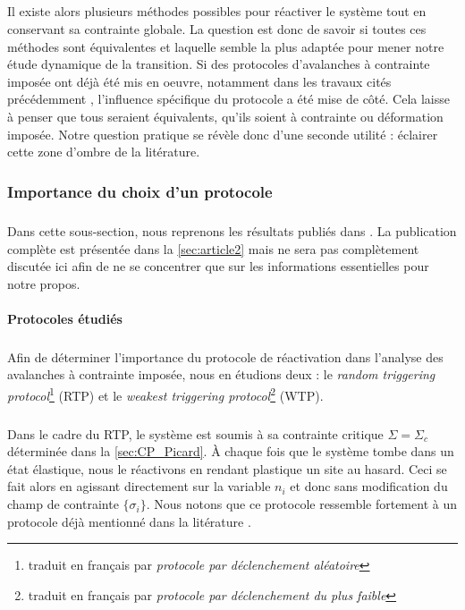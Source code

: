\subparagraph{}Il existe alors plusieurs méthodes possibles pour réactiver le système tout en conservant sa contrainte globale. La question est donc de savoir si toutes ces méthodes sont équivalentes et laquelle semble la plus adaptée pour mener notre étude dynamique de la transition. Si des protocoles d'avalanches à contrainte imposée ont déjà été mis en oeuvre, notamment dans les travaux cités précédemment \cite{budrikis_universal_2017, lin_scaling_2014}, l'influence spécifique du protocole a été mise de côté. Cela laisse à penser que tous seraient équivalents, qu'ils soient à contrainte ou déformation imposée. Notre question pratique se révèle donc d'une seconde utilité : éclairer cette zone d'ombre de la litérature.

\subsubsection{Importance du choix d'un protocole}

\label{sec:imp_prot}

\subparagraph{}Dans cette sous-section, nous reprenons les résultats publiés dans \cite{jocteur_protocol_2025}. La publication complète est présentée dans la \autoref{sec:article2} mais ne sera pas complètement discutée ici afin de ne se concentrer que sur les informations essentielles pour notre propos.

\paragraph{Protocoles étudiés}

\subparagraph{}Afin de déterminer l'importance du protocole de réactivation dans l'analyse des avalanches à contrainte imposée, nous en étudions deux : le \textit{random triggering protocol}\footnote{traduit en français par \textit{protocole par déclenchement aléatoire}} (RTP) et le \textit{weakest triggering protocol}\footnote{traduit en français par \textit{protocole par déclenchement du plus faible}} (WTP).

\subparagraph{}Dans le cadre du RTP, le système est soumis à sa contrainte critique $\Sigma = \Sigma_c$ déterminée dans la \autoref{sec:CP_Picard}. \`A chaque fois que le système tombe dans un état élastique, nous le réactivons en rendant plastique un site au hasard. Ceci se fait alors en agissant directement sur la variable $n_i$ et donc sans modification du champ de contrainte $\{\sigma_i\}$. Nous notons que ce protocole ressemble fortement à un protocole déjà mentionné dans la litérature \cite{lin_scaling_2014}.

